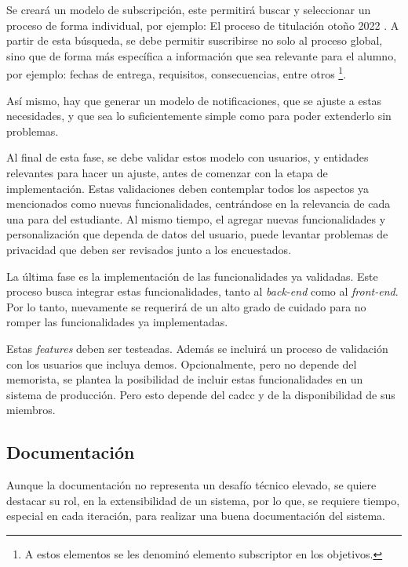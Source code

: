     \par Se creará un modelo de subscripción, este permitirá buscar y seleccionar un proceso de forma individual, por ejemplo: \guillemotleft El proceso de titulación otoño 2022 \guillemotright.  A partir de esta búsqueda, se debe permitir suscribirse no solo al proceso global, sino que de forma más específica a información que sea relevante para el alumno, por ejemplo: fechas de entrega, requisitos, consecuencias, entre otros \footnote{A estos elementos se les denominó \guillemotleft elemento subscriptor \guillemotright en los objetivos.}.
    
    \par Así mismo, hay que generar un modelo de notificaciones, que se ajuste a estas necesidades, y que sea lo suficientemente simple como para poder extenderlo sin problemas.
   
    \par Al final de esta fase, se debe validar estos modelo con usuarios, y entidades relevantes para hacer un ajuste, antes de comenzar con la etapa de implementación. Estas validaciones deben contemplar todos los aspectos ya mencionados como nuevas funcionalidades, centrándose en la relevancia de cada una para del estudiante. Al mismo tiempo, el agregar nuevas funcionalidades y personalización que dependa de datos del usuario, puede levantar problemas de privacidad que deben ser revisados junto a los encuestados.

    \par La última fase es la implementación de las funcionalidades ya validadas. Este proceso busca integrar estas funcionalidades, tanto al \textit{back-end} como al \textit{front-end}. Por lo tanto, nuevamente se requerirá de un alto grado de cuidado para no romper las funcionalidades ya implementadas.
    \par Estas \textit{features} deben ser testeadas. Además se incluirá un proceso de validación con los usuarios que incluya demos. Opcionalmente, pero no depende del memorista, se plantea la posibilidad de incluir estas funcionalidades en un sistema de producción. Pero esto depende del \acrshort{cadcc} y de la disponibilidad de sus miembros.
    \subsection{Documentación}
    \par Aunque la documentación no representa un desafío técnico elevado, se quiere destacar su rol, en la extensibilidad de un sistema, por lo que, se requiere tiempo, especial en cada iteración, para realizar una buena documentación del sistema.
    
